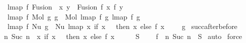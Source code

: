 \begin{isabellebody}
\ {\isacharbar}{\kern0pt}\ \ {\isachardoublequoteopen}lmap\ f\ {\isacharparenleft}{\kern0pt}Fusion\ \ x\ y{\isacharparenright}{\kern0pt}\ {\isacharequal}{\kern0pt}\ Fusion\ {\isacharparenleft}{\kern0pt}f\ x{\isacharparenright}{\kern0pt}\ {\isacharparenleft}{\kern0pt}f\ y{\isacharparenright}{\kern0pt}{\isachardoublequoteclose}\isanewline
\ {\isacharbar}{\kern0pt}\ \ {\isachardoublequoteopen}lmap\ f\ {\isacharparenleft}{\kern0pt}Mol\ g{}\ g{}{\isacharparenright}{\kern0pt}\ {\isacharequal}{\kern0pt}\ Mol\ {\isacharparenleft}{\kern0pt}lmap\ f\ g{}{\isacharparenright}{\kern0pt}\ {\isacharparenleft}{\kern0pt}lmap\ f\ g{}{\isacharparenright}{\kern0pt}{\isachardoublequoteclose}\isanewline
\ {\isacharbar}{\kern0pt}\ \ {\isachardoublequoteopen}lmap\ f\ {\isacharparenleft}{\kern0pt}Nu\ g{\isacharparenright}{\kern0pt}\ {\isacharequal}{\kern0pt}\ Nu\ {\isacharparenleft}{\kern0pt}lmap\ {\isacharparenleft}{\kern0pt}{\isasymlambda}x{\isachardot}{\kern0pt}\ if\ x\ {\isacharequal}{\kern0pt}\ {}\ then\ x\ else\ {\isacharparenleft}{\kern0pt}f\ {\isacharparenleft}{\kern0pt}x\ {\isacharminus}{\kern0pt}\ {}{\isacharparenright}{\kern0pt}\ {\isacharplus}{\kern0pt}\ {}{\isacharparenright}{\kern0pt}{\isacharparenright}{\kern0pt}\ g{\isacharparenright}{\kern0pt}{\isachardoublequoteclose}\isanewline
\isanewline
\isanewline
{}\isamarkupfalse%
\ succ{\isacharunderscore}{\kern0pt}after{\isacharunderscore}{\kern0pt}before{\isacharcolon}{\kern0pt}\isanewline
\ \ {\isachardoublequoteopen}{\isacharbraceleft}{\kern0pt}n{\isachardot}{\kern0pt}\ Suc\ n\ {\isasymin}\ {\isacharparenleft}{\kern0pt}{\isasymlambda}x{\isachardot}{\kern0pt}\ if\ x\ {\isacharequal}{\kern0pt}\ {}\ then\ x\ else\ {\isacharparenleft}{\kern0pt}f\ {\isacharparenleft}{\kern0pt}x\ {\isacharminus}{\kern0pt}\ {}{\isacharparenright}{\kern0pt}\ {\isacharplus}{\kern0pt}\ {}{\isacharparenright}{\kern0pt}{\isacharparenright}{\kern0pt}\ {\isacharbackquote}{\kern0pt}\ S{\isacharbraceright}{\kern0pt}\ {\isacharequal}{\kern0pt}\isanewline
\ \ \ f\ {\isacharbackquote}{\kern0pt}\ {\isacharbraceleft}{\kern0pt}n{\isachardot}{\kern0pt}\ Suc\ n\ {\isasymin}\ S{\isacharbraceright}{\kern0pt}{\isachardoublequoteclose}\isanewline
%
\isadelimproof
%
\endisadelimproof
%
\isatagproof
{}\isamarkupfalse%
\ auto\isanewline
{}\isamarkupfalse%
\ force%
\endisatagproof
{\isafoldproof}%
%
\isadelimproof
%
\endisadelimproof
%
\begin{isamarkuptext}%

\end{isamarkuptext}
\end{isabellebody}
